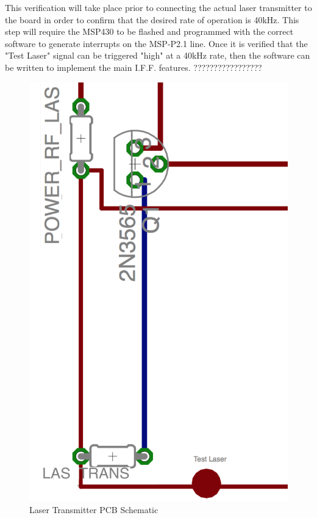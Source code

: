 \documentclass[letterpaper,10pt]{article}
\begin{document}
\begin{spacing}{1.15}
This verification will take place prior to connecting the actual laser transmitter to the board in order to confirm that the desired rate of operation is 40kHz. This step will require the MSP430 to be flashed and programmed with the correct software to generate interrupts on the MSP-P2.1 line. Once it is verified that the "Test Laser" signal can be triggered "high" at a 40kHz rate, then the software can be written to implement the main I.F.F. features. ?????????????????
\begin{figure} [H]
	\centering
	\includegraphics[scale=0.4]{transmitter-pcb.png}
	\caption{Laser Transmitter PCB Schematic\label{fig:laser-pcb}}
\end{figure}


\end{spacing}
\end{document}
